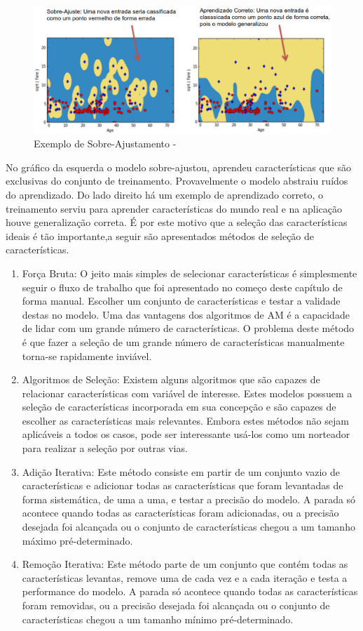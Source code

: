 \begin{figure}[!h]
\centering
\includegraphics[keepaspectratio=true,scale=0.40]
{figuras/overfitting.eps}
\caption{Exemplo de Sobre-Ajustamento - \cite{real2013}}
\label{over}
\end{figure}

No gráfico da esquerda o modelo sobre-ajustou, aprendeu características que são exclusivas do conjunto de treinamento. Provavelmente o modelo abstraiu ruídos do aprendizado. Do lado direito há um exemplo de aprendizado correto, o treinamento serviu para aprender características do mundo real e na aplicação houve generalização correta. É por este motivo que a seleção das características ideais é tão importante,a seguir são apresentados  métodos de seleção de características.

\begin{enumerate}
\item Força Bruta: O jeito mais simples de selecionar características é simplesmente seguir o fluxo de trabalho que foi apresentado no começo deste capítulo de forma manual. Escolher um conjunto de características e testar a validade destas no modelo. Uma das vantagens dos algoritmos de AM é a capacidade de lidar com um grande número de características. O problema deste método é que fazer a seleção de um grande número de características manualmente torna-se rapidamente inviável. 
\item Algoritmos de Seleção: Existem alguns algoritmos que são capazes de relacionar características com variável de interesse. Estes modelos possuem a seleção de características incorporada em sua concepção e são capazes de escolher as características mais relevantes. Embora estes métodos não sejam aplicáveis a todos os casos, pode ser interessante usá-los como um norteador para realizar a seleção por outras vias. 
\item Adição Iterativa: Este método consiste em partir de um conjunto vazio de características e adicionar todas as características que foram levantadas de forma sistemática, de uma a uma, e testar a precisão do modelo. A parada só acontece quando todas as características foram adicionadas, ou a precisão desejada foi alcançada ou o conjunto de características chegou a um tamanho máximo pré-determinado.
\item Remoção Iterativa: Este método parte de um conjunto que contém todas as características levantas, remove uma de cada vez e a cada iteração e testa a performance do modelo. A parada só acontece quando todas as características foram removidas, ou a precisão desejada foi alcançada ou o conjunto de características chegou a um tamanho mínimo pré-determinado.
\end{enumerate}

